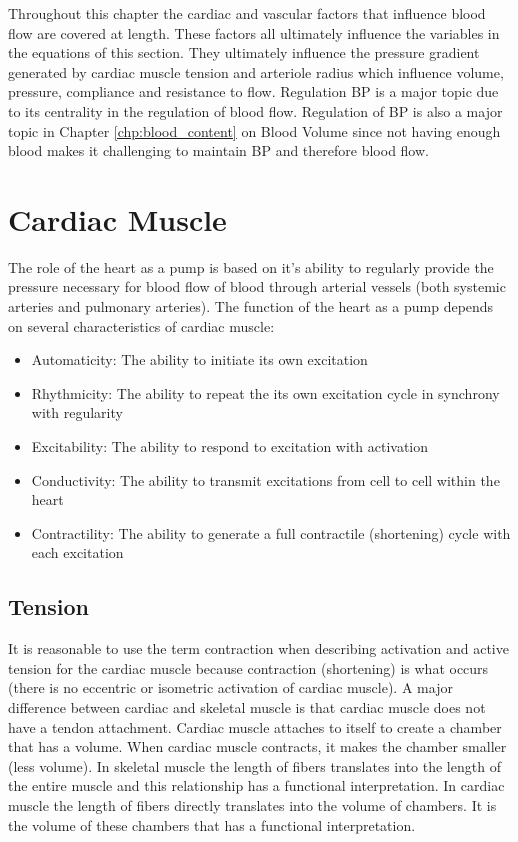 Throughout this chapter the cardiac and vascular factors that influence blood flow are covered at length. These factors all ultimately influence the variables in the equations of this section. They ultimately influence the pressure gradient generated by cardiac muscle tension and arteriole radius which influence volume, pressure, compliance and resistance to flow. Regulation BP is a major topic due to its centrality in the regulation of blood flow. Regulation of BP is also a major topic in Chapter \ref{chp:blood_content} on Blood Volume since not having enough blood makes it challenging to maintain BP and therefore blood flow.

\section{Cardiac Muscle}

The role of the heart as a pump is based on it's ability to regularly provide the pressure necessary for blood flow of blood through arterial vessels (both systemic arteries and pulmonary arteries). The function of the heart as a pump depends on several characteristics of cardiac muscle:

\begin{itemize}
    
    \item Automaticity: The ability to initiate its own excitation
    \item Rhythmicity: The ability to repeat the its own excitation cycle in synchrony with regularity
    \item Excitability: The ability to respond to excitation with activation
    \item Conductivity: The ability to transmit excitations from cell to cell within the heart
    \item Contractility: The ability to generate a full contractile (shortening) cycle with each excitation
 
\end{itemize}

\subsection{Tension}

It is reasonable to use the term contraction when describing activation and active tension for the cardiac muscle because contraction (shortening) is what occurs (there is no eccentric or isometric activation of cardiac muscle). A major difference between cardiac and skeletal muscle is that cardiac muscle does not have a tendon attachment. Cardiac muscle attaches to itself to create a chamber that has a volume. When cardiac muscle contracts, it makes the chamber smaller (less volume). In skeletal muscle the length of fibers translates into the length of the entire muscle and this relationship has a functional interpretation. In cardiac muscle the length of fibers directly translates into the volume of chambers. It is the volume of these chambers that has a functional interpretation. 

